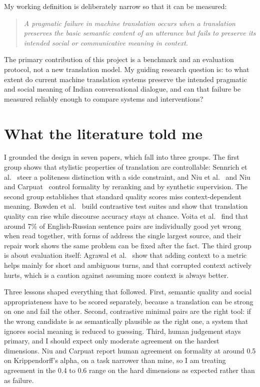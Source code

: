 \documentclass[11pt]{article}
\begin{document}
My working definition is deliberately narrow so that it can be measured:

\begin{quote}
\itshape
A pragmatic failure in machine translation occurs when a translation preserves the
basic semantic content of an utterance but fails to preserve its intended social or
communicative meaning in context.
\end{quote}

The primary contribution of this project is a benchmark and an evaluation protocol,
not a new translation model. My guiding research question is: to what extent do
current machine translation systems preserve the intended pragmatic and social
meaning of Indian conversational dialogue, and can that failure be measured
reliably enough to compare systems and interventions?

\section{What the literature told me}

I grounded the design in seven papers, which fall into three groups. The first
group shows that stylistic properties of translation are controllable: Sennrich et
al.~\cite{sennrich2016} steer a politeness distinction with a side constraint, and
Niu et al.~\cite{niu2017} and Niu and Carpuat~\cite{niu2020} control formality by
reranking and by synthetic supervision. The second group establishes that standard
quality scores miss context-dependent meaning. Bawden et al.~\cite{bawden2018}
build contrastive test suites and show that translation quality can rise while
discourse accuracy stays at chance. Voita et al.~\cite{voita2019a} find that around
7\% of English-Russian sentence pairs are individually good yet wrong when read
together, with forms of address the single largest source, and their repair work
\cite{voita2019b} shows the same problem can be fixed after the fact. The third
group is about evaluation itself: Agrawal et al.~\cite{agrawal2024} show that adding
context to a metric helps mainly for short and ambiguous turns, and that corrupted
context actively hurts, which is a caution against assuming more context is always
better.

Three lessons shaped everything that followed. First, semantic quality and social
appropriateness have to be scored separately, because a translation can be strong
on one and fail the other. Second, contrastive minimal pairs are the right tool:
if the wrong candidate is as semantically plausible as the right one, a system that
ignores social meaning is reduced to guessing. Third, human judgement stays
primary, and I should expect only moderate agreement on the hardest dimensions.
Niu and Carpuat report human agreement on formality at around 0.5 on
Krippendorff's alpha, on a task narrower than mine, so I am treating agreement in
the 0.4 to 0.6 range on the hard dimensions as expected rather than as failure.
\end{document}
